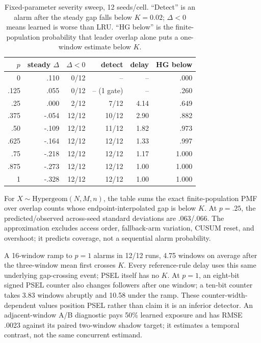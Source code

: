 \documentclass{article}
\begin{document}
\begin{table}[h]
\caption{Fixed-parameter severity sweep, 12 seeds/cell.  ``Detect'' is an alarm
after the steady gap falls below $K=0.02$; $\Delta<0$ means learned is worse than
LRU.  ``HG below'' is the finite-population probability that leader overlap alone
puts a one-window estimate below $K$.}
\centering\small
\begin{tabular}{@{}rrrrrr@{}}
\toprule
$p$ & steady $\Delta$ & $\Delta<0$ & detect & delay & HG below \\
\midrule
0 & .110 & 0/12 & -- & -- & .000 \\
.125 & .055 & 0/12 & -- (1 gate) & -- & .260 \\
.25 & .000 & 2/12 & 7/12 & 4.14 & .649 \\
.375 & -.054 & 12/12 & 10/12 & 2.90 & .882 \\
.50 & -.109 & 12/12 & 11/12 & 1.82 & .973 \\
.625 & -.164 & 12/12 & 12/12 & 1.33 & .997 \\
.75 & -.218 & 12/12 & 12/12 & 1.17 & 1.000 \\
.875 & -.273 & 12/12 & 12/12 & 1.00 & 1.000 \\
1 & -.328 & 12/12 & 12/12 & 1.00 & 1.000 \\
\bottomrule
\end{tabular}
\end{table}

For $X\sim\mathrm{Hypergeom}(N,M,n)$, the table sums the exact finite-population
PMF over overlap counts whose endpoint-interpolated gap is below $K$.  At
$p=.25$, the predicted/observed across-seed standard deviations are .063/.066.
The approximation excludes access order, fallback-arm variation, CUSUM reset,
and overshoot; it predicts coverage, not a sequential alarm probability.

A 16-window ramp to $p=1$ alarms in 12/12 runs, 4.75 windows on average after
the three-window mean first crosses $K$.  Every reference-rule delay uses this
same underlying gap-crossing event; PSEL itself has no $K$.  At $p=1$, an
eight-bit signed PSEL
counter also changes followers after one window; a ten-bit counter takes 3.83
windows abruptly and 10.58 under the ramp.  These counter-width-dependent values
position PSEL rather than claim it is an inferior detector.  An adjacent-window
A/B diagnostic pays 50\% learned exposure and has RMSE .0023 against its paired
two-window shadow target; it estimates a temporal contrast, not the same
concurrent estimand.
\end{document}
